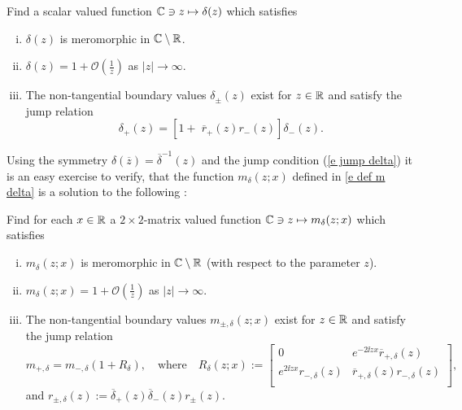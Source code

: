 \begin{framed}
    \begin{rhp}\label{rhp delta}
        Find a scalar valued function $\mathbb C\ni z\mapsto \delta(z)$ which satisfies
        \begin{enumerate}[(i)]
          \item $\delta(z)$ is meromorphic in $\mathbb C\setminus\mathbb R$.
          \item $\delta(z)=1+\mathcal{O} \left(\frac{1}{z}\right)$ as $|z|\to\infty$.
          \item The non-tangential boundary values $\delta_{\pm}(z)$ exist for $z\in\mathbb R$ and satisfy the jump relation
              \begin{equation}\label{e jump delta}
                 \delta_+(z)=\left[1+ \phantom{\widehat{l}}\overline{r}_+(z)r_-(z) \right] \delta_-(z).
              \end{equation}
        \end{enumerate}
    \end{rhp}
\end{framed}
Using the symmetry $\delta(\overline{z})=\overline{\delta}^{-1}(z)$ and the jump condition (\ref{e jump delta}) it is an easy exercise to verify, that the function $m_{\delta}(z;x)$ defined in \ref{e def m delta} is a solution to the following \rh:
\begin{samepage}
\begin{framed}
    \begin{rhp}\label{rhp m^0 delta}
        Find for each $x\in\mathbb R$ a $2\times 2$-matrix valued function $\mathbb C\ni z\mapsto m_{\delta}(z;x)$ which satisfies
        \begin{enumerate}[(i)]
          \item $m_{\delta}(z;x)$ is meromorphic in $\mathbb C\setminus\mathbb R$ (with respect to the parameter $z$).
          \item $m_{\delta}(z;x)=1+\mathcal{O} \left(\frac{1}{z}\right)$ as $|z|\to\infty$.
          \item The non-tangential boundary values $m_{\pm,\delta}(z;x)$ exist for $z\in\mathbb R$ and satisfy the jump relation
              \begin{equation}\label{e jump m^0 delta}
                  m_{+,\delta}=m_{-,\delta}(1+R_{\delta}) ,\quad\text{where}\quad
                  R_{\delta}(z;x):=
                  \left[
                    \begin{array}{cc}
                       0 & e^{-2\ii zx}\overline{r}_{+,\delta}(z) \\
                       e^{2\ii zx}r_{-,\delta}(z) & \overline{r}_{+,\delta}(z) r_{-,\delta}(z) \\
                    \end{array}
                  \right],
              \end{equation}
              and $r_{\pm,\delta}(z):= \overline{\delta}_+(z) \overline{\delta}_-(z)r_{\pm}(z)$.
        \end{enumerate}
    \end{rhp}
\end{framed}
\end{samepage}
